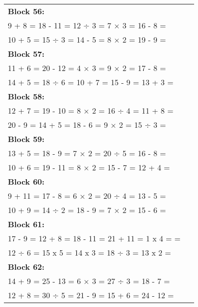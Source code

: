 \documentclass[a4paper,12pt]{scrartcl}
\begin{document}
\begin{adjustbox}{center, valign=c}
\begin{tabular}{@{}p{0.95\linewidth}@{}}

\textbf{Block 56:}\\
9 + 8 = \hfill 18 - 11 = \hfill 12 ÷ 3 = \hfill 7 × 3 = \hfill 16 - 8 =\\
10 + 5 = \hfill 15 ÷ 3 = \hfill 14 - 5 = \hfill 8 × 2 = \hfill 19 - 9 =\\[0.6em]

\textbf{Block 57:}\\
11 + 6 = \hfill 20 - 12 = \hfill 4 × 3 = \hfill 9 × 2 = \hfill 17 - 8 =\\
14 + 5 = \hfill 18 ÷ 6 = \hfill 10 + 7 = \hfill 15 - 9 = \hfill 13 + 3 =\\[0.6em]

\textbf{Block 58:}\\
12 + 7 = \hfill 19 - 10 = \hfill 8 × 2 = \hfill 16 ÷ 4 = \hfill 11 + 8 =\\
20 - 9 = \hfill 14 + 5 = \hfill 18 - 6 = \hfill 9 × 2 = \hfill 15 ÷ 3 =\\[0.6em]

\textbf{Block 59:}\\
13 + 5 = \hfill 18 - 9 = \hfill 7 × 2 = \hfill 20 ÷ 5 = \hfill 16 - 8 =\\
10 + 6 = \hfill 19 - 11 = \hfill 8 × 2 = \hfill 15 - 7 = \hfill 12 + 4 =\\[0.6em]

\textbf{Block 60:}\\
9 + 11 = \hfill 17 - 8 = \hfill 6 × 2 = \hfill 20 ÷ 4 = \hfill 13 - 5 =\\
10 + 9 = \hfill 14 ÷ 2 = \hfill 18 - 9 = \hfill 7 × 2 = \hfill 15 - 6 =\\[0.6em]

\textbf{Block 61:}\\

17 - 9 = \hfill 12 + 8 = \hfill 18 - 11 = \hfill 21 + 11 = \hfill 1 x 4 = =\\
12 ÷ 6 = \hfill 15 x 5 = \hfill 14 x 3 = \hfill 18 ÷ 3 = \hfill 13 x 2 =\\[0.6em]

\textbf{Block 62:}\\
14 + 9 = \hfill 25 - 13 = \hfill 6 × 3 = \hfill 27 ÷ 3 = \hfill 18 - 7 =\\
12 + 8 = \hfill 30 ÷ 5 = \hfill 21 - 9 = \hfill 15 + 6 = \hfill 24 - 12 =\\[0.6em]


\end{tabular}
\end{adjustbox}
\end{document}
